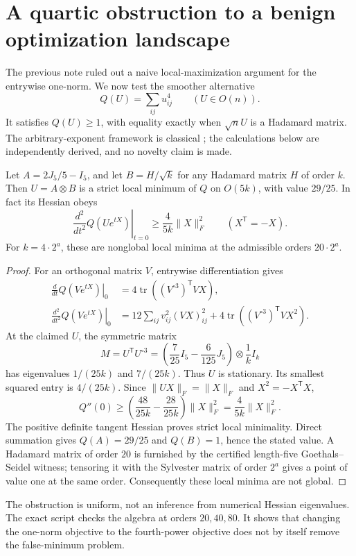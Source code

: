 \section{A quartic obstruction to a benign optimization landscape}
The previous note ruled out a naive local-maximization argument for
the entrywise one-norm. We now test the smoother alternative
\[
 Q(U)=\sum_{ij}u_{ij}^4\qquad(U\in O(n)).
\]
It satisfies $Q(U)\ge1$, with equality exactly when $\sqrt nU$ is a
Hadamard matrix. The arbitrary-exponent framework is classical
\cite{ArbitraryP}; the calculations below are independently derived,
and no novelty claim is made.

\begin{proposition}
Let $A=2J_5/5-I_5$, and let $B=H/\sqrt k$ for any Hadamard matrix
$H$ of order $k$. Then $U=A\otimes B$ is a strict local minimum of
$Q$ on $O(5k)$, with value $29/25$. In fact its Hessian obeys
\[
 \left.\frac{d^2}{dt^2}Q(Ue^{tX})\right|_{t=0}
 \ge\frac4{5k}\|X\|_F^2
 \qquad(X^{\mathsf T}=-X).
\]
For $k=4\cdot2^a$, these are nonglobal local minima at the admissible
orders $20\cdot2^a$.
\end{proposition}
\begin{proof}
For an orthogonal matrix $V$, entrywise differentiation gives
\begin{align*}
 \left.\frac{d}{dt}Q(Ve^{tX})\right|_{0}
 &=4\operatorname{tr}((V^{\circ3})^{\mathsf T}VX),\\
 \left.\frac{d^2}{dt^2}Q(Ve^{tX})\right|_{0}
 &=12\sum_{ij}v_{ij}^2(VX)_{ij}^2
   +4\operatorname{tr}((V^{\circ3})^{\mathsf T}VX^2).
\end{align*}
At the claimed $U$, the symmetric matrix
\[
 M=U^{\mathsf T}U^{\circ3}
  =\left(\frac7{25}I_5-\frac6{125}J_5\right)\otimes\frac1kI_k
\]
has eigenvalues $1/(25k)$ and $7/(25k)$. Thus $U$ is stationary.
Its smallest squared entry is $4/(25k)$. Since
$\|UX\|_F=\|X\|_F$ and $X^2=-X^{\mathsf T}X$,
\[
 Q''(0)\ge\left(\frac{48}{25k}-\frac{28}{25k}\right)\|X\|_F^2
 =\frac4{5k}\|X\|_F^2.
\]
The positive definite tangent Hessian proves strict local minimality.
Direct summation gives $Q(A)=29/25$ and $Q(B)=1$, hence the stated
value. A Hadamard matrix of order $20$ is furnished by the certified
length-five Goethals--Seidel witness; tensoring it with the Sylvester
matrix of order $2^a$ gives a point of value one at the same order.
Consequently these local minima are not global.
\end{proof}

The obstruction is uniform, not an inference from numerical Hessian
eigenvalues. The exact script checks the algebra at orders $20,40,80$.
It shows that changing the one-norm objective to the fourth-power
objective does not by itself remove the false-minimum problem.

